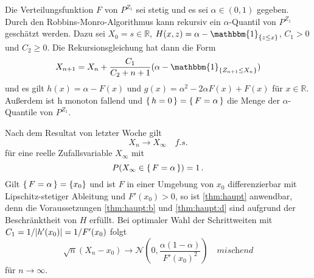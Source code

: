 \documentclass[ngerman,a4paper,11pt]{scrartcl}
\newcommand{\RR}{\mathbb{R}}
\newcommand{\nn}{\mathcal{N}}
\newcommand{\indics}[1]{\mathbbm{1}_{\{#1\}}}
\DeclarePairedDelimiter{\abs}{\lvert}{\rvert}		%
\begin{document}
\begin{exmp}
  Die Verteilungsfunktion $F$ von $P^{Z_1}$ sei stetig und es sei $\alpha\in (0,
  1)$ gegeben. Durch den Robbins-Monro-Algorithmus kann rekursiv ein
  $\alpha$-Quantil von $P^{Z_1}$ geschätzt werden. Dazu sei $X_0=s\in\RR$,
  $H(x,z)=\alpha-\indics{z\leq x}$, $C_1>0$ und $C_2\geq 0$. Die
  Rekursionsgleichung hat dann die Form
  \begin{equation*}
   X_{n+1}=X_n+\frac{C_1}{C_2+n+1}(\alpha-\indics{Z_{n+1}\leq X_n})
  \end{equation*}
  und es gilt $h(x)=\alpha -F(x)$ und $g(x)=\alpha^2-2\alpha F(x)+F(x)$ für
  $x\in\RR$. Außerdem ist h monoton fallend und $\set{h=0}=\set{F=\alpha}$ die
  Menge der $\alpha$-Quantile von $P^{Z_1}$.
  
Nach dem Resultat von letzter Woche gilt
\begin{equation*}
 X_n\to X_\infty\quad\textit{f.s.}
\end{equation*}
für eine reelle Zufallsvariable $X_\infty$ mit
\begin{equation*}
  P(X_\infty\in\set{F=\alpha})=1\,. 
\end{equation*}
Gilt $\set{F=\alpha}=\{x_0\}$ und ist $F$ in einer Umgebung von $x_0$
differenzierbar mit Lipschitz-stetiger Ableitung und $F'(x_0)>0$, so ist
\cref{thm:haupt} anwendbar, denn die Voraussetzungen \ref{thm:haupt:b} und
\ref{thm:haupt:d} sind aufgrund der Beschränktheit von $H$ erfüllt. Bei
optimaler Wahl der Schrittweiten mit $C_1=1/\abs{h'(x_0)}=1/F'(x_0)$ folgt
\begin{equation*}
 \sqrt{n}(X_n-x_0)\to\nn\left(0, \frac{\alpha(1-\alpha)}{F'(x_0)^2}\right)\quad\textit{mischend}
\end{equation*}
für $n\to\infty$.
\end{exmp}
\printbibliography
\end{document}
